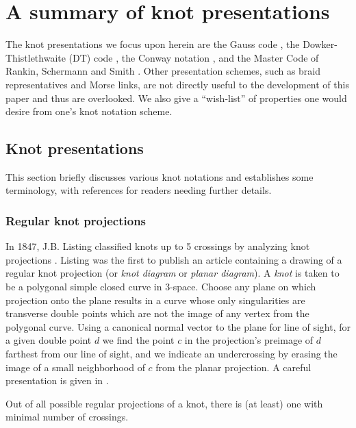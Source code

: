 \section{A summary of knot presentations}\label{sec:notation} %


The knot presentations we focus upon herein are the Gauss code \cite{Read1977On-the-Gauss-cr}, the
Dowker-Thistle\-thwaite (DT) code \cite{DT}, the Conway notation \cite{Conway1970An-enumeration-}, and the Master
Code of Rankin, Schermann and Smith \cite{Rankin2004Enumerating-I} \cite{Rankin2004Enumerating-II}. Other presentation schemes, such
as braid representatives and Morse links, are not directly useful to
the development of this paper and thus are overlooked. We also give a
``wish-list'' of properties one would desire from one's knot notation
scheme.

\subsection{Knot presentations}
This section briefly discusses various knot notations and establishes
some terminology, with references for readers needing further details.

\subsubsection{Regular knot projections}

In 1847, J.B. Listing classified knots up to 5 crossings by analyzing
knot projections \cite{Listing1848Vorstudien-zur-}. Listing was the
first to publish an article containing a drawing of a regular knot
projection (or \emph{knot diagram} or \emph{planar diagram}). A
\emph{knot} is taken to be a polygonal simple closed curve in
$3$-space. Choose any plane on which projection onto the plane results
in a curve whose only singularities are transverse double points which
are not the image of any vertex from the polygonal curve. Using a
canonical normal vector to the plane for line of sight, for a given
double point $d$ we find the point $c$ in the projection's preimage of
$d$ farthest from our line of sight, and we indicate an undercrossing
by erasing the image of a small neighborhood of $c$ from the planar
projection. A careful presentation is given in \cite{LivingstonText}.
	
Out of all possible regular projections of a knot, there is (at least)
one with minimal number of crossings. 



